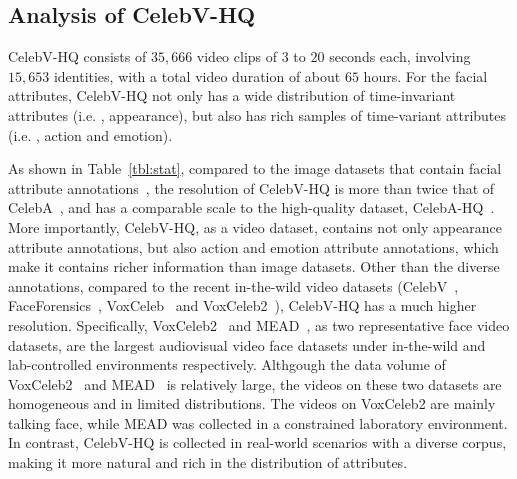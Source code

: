 \subsection{Analysis of CelebV-HQ} CelebV-HQ consists of $35,666$ video clips of $3$ to $20$ seconds each, involving $15,653$ identities, with a total video duration of about $65$ hours. For the facial attributes, CelebV-HQ not only has a wide distribution of time-invariant attributes (i.e. , appearance), but also has rich samples of time-variant attributes (i.e. , action and emotion).

As shown in Table~\ref{tbl:stat}, compared to the image datasets that contain facial attribute annotations~\cite{celeba15,celebahq}, the resolution of CelebV-HQ is more than twice that of CelebA~\cite{celebahq}, and has a comparable scale to the high-quality dataset, CelebA-HQ~\cite{celeba15}. More importantly, CelebV-HQ, as a video dataset, contains not only appearance attribute annotations, but also action and emotion attribute annotations, which make it contains richer information than image datasets. Other than the diverse annotations, compared to the recent in-the-wild video datasets (CelebV~\cite{wayne2018reenactgan}, FaceForensics~\cite{faceforensics}, VoxCeleb~\cite{vox17} and VoxCeleb2~\cite{vox2}), CelebV-HQ has a much higher resolution. Specifically, VoxCeleb2~\cite{vox2} and MEAD~\cite{mead}, as two representative face video datasets, are the largest audiovisual video face datasets under in-the-wild and lab-controlled environments respectively. Althgough the data volume of VoxCeleb2~\cite{vox2} and MEAD~\cite{mead} is relatively large, the videos on these two datasets are homogeneous and in limited distributions. The videos on VoxCeleb2 are mainly talking face, while MEAD was collected in a constrained laboratory environment. In contrast, CelebV-HQ is collected in real-world scenarios with a diverse corpus, making it more natural and rich in the distribution of attributes. 


